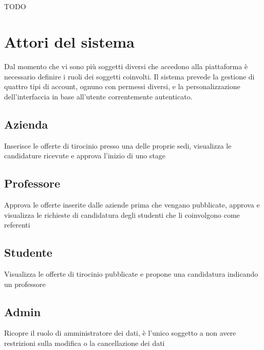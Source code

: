 \subsection{\angular}

TODO

\section{Attori del sistema}

Dal momento che vi sono più soggetti diversi che accedono alla piattaforma è necessario definire i ruoli dei soggetti coinvolti. Il sistema prevede la gestione di quattro tipi di account, ognuno con permessi diversi, e la personalizzazione dell'interfaccia in base all'utente correntemente autenticato.

\subsection{Azienda}
Inserisce le offerte di tirocinio presso una delle proprie sedi, visualizza le candidature ricevute e approva l'inizio di uno stage

\subsection{Professore}
Approva le offerte inserite dalle aziende prima che vengano pubblicate, approva e visualizza le richieste di candidatura degli studenti che li coinvolgono come referenti

\subsection{Studente}
Visualizza le offerte di tirocinio pubblicate e propone una candidatura indicando un professore

\subsection{Admin}
Ricopre il ruolo di amministratore dei dati, è l'unico soggetto a non avere restrizioni sulla modifica o la cancellazione dei dati